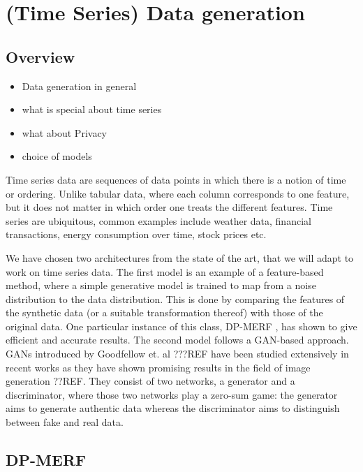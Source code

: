 \section[(Time Series) Data generation]{(Time Series) Data generation}\label{chapter3}
\subsection{Overview}
    \begin{itemize}
        \item Data generation in general
        \item what is special about time series
        \item what about Privacy
        \item choice of models
    \end{itemize}

Time series data are sequences of data points in which there is a notion of time or ordering. Unlike tabular data, where each column corresponds to one feature, but it does not matter in which order one treats the different features. Time series are ubiquitous, common examples include weather data, financial transactions, energy consumption over time, stock prices etc.

We have chosen two architectures from the state of the art, that we will adapt to work on time series data. The first model is an example of a feature-based method, where a simple generative model is trained to map from a noise distribution to the data distribution. This is done by comparing the features of the synthetic data (or a suitable transformation thereof) with those of the original data. One particular instance of this class, DP-MERF \parencite{dpmerf}, has shown to give efficient and accurate results. The second model follows a GAN-based approach. GANs introduced by Goodfellow et. al ???REF have been studied extensively in recent works as they have shown promising results in the field of image generation ??REF. They consist of two networks, a generator and a discriminator, where those two networks play a zero-sum game: the generator aims to generate authentic data whereas the discriminator aims to distinguish between fake and real data.


\subsection{DP-MERF}

